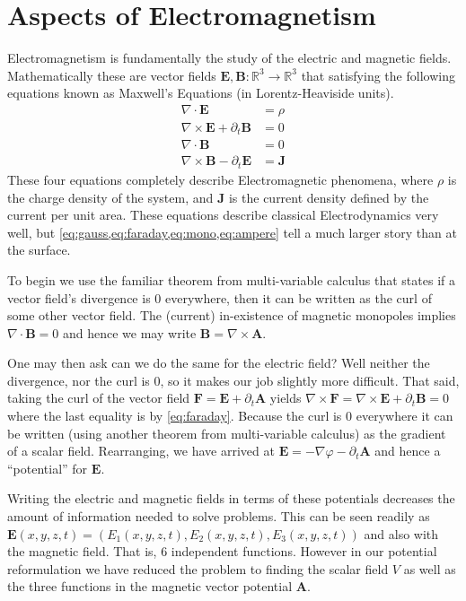 \section{Aspects of Electromagnetism}

Electromagnetism is fundamentally the study of the electric and magnetic fields.
Mathematically these are vector fields
\(\mathbf{E},\mathbf{B}: \mathbb{R}^3 \to \mathbb{R}^3\) that satisfying the
following equations known as Maxwell's Equations (in Lorentz-Heaviside units).
\begin{align}
    \nabla\cdot\mathbf{E}                         & = \rho       \label{eq:gauss}   \\
    \nabla\times\mathbf{E} + \partial_t\mathbf{B} & = 0          \label{eq:faraday} \\
    \nabla\cdot\mathbf{B}                         & = 0          \label{eq:mono}    \\
    \nabla\times\mathbf{B} - \partial_t\mathbf{E} & = \mathbf{J} \label{eq:ampere}
\end{align}
These four equations completely describe Electromagnetic phenomena, where
\(\rho\) is the charge density of the system, and \(\mathbf{J}\) is the current
density defined by the current per unit area. These equations describe classical
Electrodynamics very well, but \cref{eq:gauss,eq:faraday,eq:mono,eq:ampere} tell
a much larger story than at the surface.

To begin we use the familiar theorem from multi-variable calculus that states if
a vector field's divergence is 0 everywhere, then it can be written as the curl
of some other vector field. The (current) in-existence of magnetic monopoles
implies \(\nabla \cdot \mathbf{B} = 0\) and hence we may write
\(\mathbf{B} = \nabla\times\mathbf{A}\).

One may then ask can we do the same for the electric field? Well neither the
divergence, nor the curl is 0, so it makes our job slightly more difficult. That
said, taking the curl of the vector field \(\mathbf{F} = \mathbf{E} + \partial_t\mathbf{A}\)
yields \(\nabla\times\mathbf{F} = \nabla\times\mathbf{E} + \partial_t\mathbf{B} = 0\)
where the last equality is by \cref{eq:faraday}. Because the curl is 0
everywhere it can be written (using another theorem from multi-variable calculus)
as the gradient of a scalar field. Rearranging, we have arrived at
\(\mathbf{E} = -\nabla \varphi - \partial_t \mathbf{A}\) and hence a
``potential'' for \(\mathbf{E}\).

Writing the electric and magnetic fields in terms of these potentials decreases
the amount of information needed to solve problems. This can be seen readily as
\(\mathbf{E}(x,y,z,t) = (E_1(x,y,z,t),E_2(x,y,z,t),E_3(x,y,z,t))\) and also with
the magnetic field. That is, 6 independent functions. However in our potential
reformulation we have reduced the problem to finding the scalar field \(V\) as
well as the three functions in the magnetic vector potential \(\mathbf{A}\).

